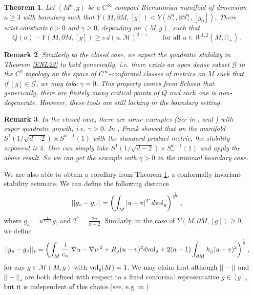 \documentclass[12pt]{amsart}
\newtheorem{theorem}{Theorem}[section]
\newtheorem{remark}[theorem]{Remark}
\newcommand{\R}{{\mathbb{R}}}
\newcommand{\g}{{\gamma}}
\newcommand{\M}{{\mathcal{M}}}
\newcommand{\na}{{\nabla}}
\newcommand{\vol}{{\rm{vol}}}
\begin{document}
\begin{theorem}\label{thm: minimizers}
 	Let $(M^n,g)$ be a $C^\infty$ compact Riemannian manifold of dimension $n\geq 3$ with boundary such that $Y(M,\partial M,[g]) < Y(S^n_+,\partial S^n_+,[g_0]) $. There exist constants $c>0$ and  $\g\ge 0 $, depending on $(M,g)$, such that 
 	\begin{equation}\label{e: minimizers}
 	Q(u) - Y(M,\partial M,[g]) \geq c\, d(u, \mathcal{M})^{2+\g}\, \qquad \text{for all } u \in W^{1,2}(M;\R_+)  \,.
 	\end{equation}
 \end{theorem}
 \begin{remark}
     Similarly to the closed case, we expect the quadratic stability in Theorem \ref{ENL22} to hold generically, i.e. there exists an open dense subset $\mathcal G$ in the $C^2$ topology on the space of $C^\infty$-conformal classes of metrics on $M$ such that if $[g] \in \mathcal G$, we may take $\g=0$. This property comes from Schoen \cite{Sc91} that generically, there are finitely many critical points of $Q$ and each one is non-degenerate. However, these tools are still lacking in the boundary setting.
 \end{remark}
 \begin{remark}
     In the closed case, there are some examples (See in \cite{Sc91}, \cite{CCR15} and \cite{Fr22}) with super quadratic growth, i.e. $\gamma>0$. In \cite{Fr22}, Frank showed that on the manifold $S^1(1/\sqrt{d-2})\times S^{d-1}(1)$ with the standard product metric, the stability exponent is $4$. One can simply take $S^1(1/\sqrt{d-2})\times S^{d-1}_+(1)$ and apply the above result.
     So we can get the example with $\gamma >0$ in the minimal boundary case.
     
 \end{remark}
We are also able to obtain  a corollary from Theorem \ref{thm: minimizers}, a conformally invariant stability estimate. We can define the following distance
\begin{equation}
    ||g_u - g_v|| =\left(\int_M |u-v|^{2^*} d \vol_g   \right) ^\frac{1}{2^*},
\end{equation}
where $g_u = u^\frac{4}{n-2}g$, and $2^*=\frac{2n}{n-2}$. Similarly, in the case of $Y(M,\partial M,[g])\ge 0$, we define
\begin{equation}
    ||g_u - g_v||_*= \left( \int_M \frac{1}{c_n} |\na u- \na v|^2 + R_g (u-v)^2 d \vol_g +2(n-1)\int _{\partial M}h_g (u-v)^2  \right)^\frac{1}{2},
\end{equation}
for any $g\in \M(M,g)$ with $\vol_g(M)=1$. We may claim that although $||-||$ and $||-||_*$ are both defined with respect to a fixed conformal representative $g\in[g]$, but it is independent of this choice.(see, e.g. in \cite{ENL22})
\end{document}
